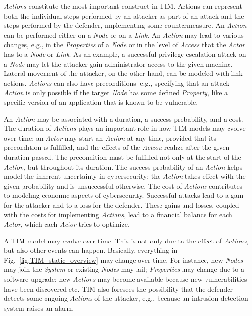 \documentclass{llncs}
\begin{document}
\emph{Actions} constitute the most important construct in TIM.
Actions can represent both the individual steps performed by an attacker as part of an attack and the steps performed by the defender, implementing some countermeasure.
An \emph{Action} can be performed either on a \emph{Node} or on a \emph{Link}.
An \emph{Action} may lead to various changes, e.g., in the \emph{Properties} of a \emph{Node} or in the level of \emph{Access} that the \emph{Actor} has to a \emph{Node} or \emph{Link}.
As an example, a successful privilege escalation attack on a \emph{Node} may let the attacker gain administrator access to the given machine.
Lateral movement of the attacker, on the other hand, can be modeled with link actions.
\emph{Actions} can also have preconditions, e.g., specifying that an attack \emph{Action} is only possible if the target \emph{Node} has some defined \emph{Property}, like a specific version of an application that is known to be vulnerable.

An \emph{Action} may be associated with a duration, a success probability, and a cost.
The duration of \emph{Actions} plays an important role in how TIM models may evolve over time: an \emph{Actor} may start an \emph{Action} at any time, provided that its precondition is fulfilled, and the effects of the \emph{Action} realize after the given duration passed.
The precondition must be fulfilled not only at the start of the \emph{Action}, but throughout its duration.
The success probability of an \emph{Action} helps model the inherent uncertainty in cybersecurity: the \emph{Action} takes effect with the given probability and is unsuccessful otherwise.
The cost of \emph{Actions} contributes to modeling economic aspects of cybersecurity.
Successful attacks lead to a gain for the attacker and to a loss for the defender.
These gains and losses, coupled with the costs for implementing \emph{Actions}, lead to a financial balance for each \emph{Actor}, which each \emph{Actor} tries to optimize.

A TIM model may evolve over time.
This is not only due to the effect of \emph{Actions}, but also other events can happen.
Basically, everything in Fig.\ \ref{fig:TIM_static_overview} may change over time.
For instance, new \emph{Nodes} may join the \emph{System} or existing \emph{Nodes} may fail; \emph{Properties} may change due to a software upgrade; new \emph{Actions} may become available because new vulnerabilities have been discovered etc.
TIM also foresees the possibility that the defender detects some ongoing \emph{Actions} of the attacker, e.g., because an intrusion detection system raises an alarm.
\end{document}
